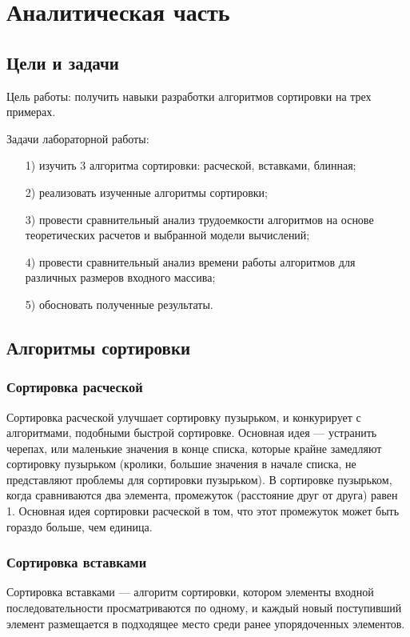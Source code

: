 \chapter{Аналитическая часть}

\section{Цели и задачи}

Цель работы: получить навыки разработки алгоритмов сортировки на трех примерах.

Задачи лабораторной работы:
\begin{enumerate}
	\item[1)] изучить 3 алгоритма сортировки: расческой, вставками, блинная;
	\item[2)] реализовать изученные алгоритмы сортировки;
	\item[3)] провести сравнительный анализ трудоемкости алгоритмов на основе теоретических расчетов и выбранной модели вычислений;
	\item[4)] провести сравнительный анализ времени работы алгоритмов для различных размеров входного массива;
	\item[5)] обосновать полученные результаты.
\end{enumerate}

\section{Алгоритмы сортировки}

\subsection{Сортировка расческой}
Сортировка расческой улучшает сортировку пузырьком, и конкурирует с алгоритмами, подобными быстрой сортировке.
Основная идея — устранить черепах, или маленькие значения в конце списка, которые крайне замедляют сортировку пузырьком (кролики, большие значения в начале списка, не представляют проблемы для сортировки пузырьком).
В сортировке пузырьком, когда сравниваются два элемента, промежуток (расстояние друг от друга) равен 1.
Основная идея сортировки расческой в том, что этот промежуток может быть гораздо больше, чем единица.

\subsection{Сортировка вставками}
Сортировка вставками — алгоритм сортировки, котором элементы входной последовательности просматриваются по одному, и каждый новый поступивший элемент размещается в подходящее место среди ранее упорядоченных элементов.

